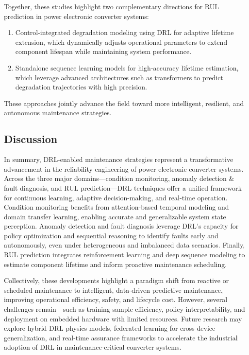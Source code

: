 Together, these studies highlight two complementary directions for RUL prediction in power electronic converter systems:
\begin{enumerate}
  \item Control-integrated degradation modeling using DRL for adaptive lifetime extension, which dynamically adjusts operational parameters to extend component lifespan while maintaining system performance.
  \item Standalone sequence learning models for high-accuracy lifetime estimation, which leverage advanced architectures such as transformers to predict degradation trajectories with high precision.
\end{enumerate}

These approaches jointly advance the field toward more intelligent, resilient, and autonomous maintenance strategies.

\subsection{Discussion}
\label{sim_model}

In summary, DRL-enabled maintenance strategies represent a transformative advancement in the reliability engineering of power electronic converter systems. Across the three major domains—condition monitoring, anomaly detection \& fault diagnosis, and RUL prediction—DRL techniques offer a unified framework for continuous learning, adaptive decision-making, and real-time operation. Condition monitoring benefits from attention-based temporal modeling and domain transfer learning, enabling accurate and generalizable system state perception. Anomaly detection and fault diagnosis leverage DRL's capacity for policy optimization and sequential reasoning to identify faults early and autonomously, even under heterogeneous and imbalanced data scenarios. Finally, RUL prediction integrates reinforcement learning and deep sequence modeling to estimate component lifetime and inform proactive maintenance scheduling.

Collectively, these developments highlight a paradigm shift from reactive or scheduled maintenance to intelligent, data-driven predictive maintenance, improving operational efficiency, safety, and lifecycle cost. However, several challenges remain—such as training sample efficiency, policy interpretability, and deployment on embedded hardware with limited resources. Future research may explore hybrid DRL-physics models, federated learning for cross-device generalization, and real-time assurance frameworks to accelerate the industrial adoption of DRL in maintenance-critical converter systems.
